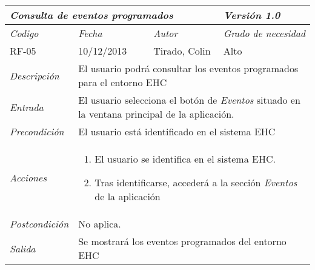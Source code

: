 \begin{tabular}{|p{3cm}|p{4cm}|p{4cm}|p{4cm}|}
\hline \multicolumn{3}{|p{9cm}|}{\textit{Consulta de eventos programados}} & \textit{Versi\'on 1.0} \\
\hline \textit{Codigo} & \textit{Fecha} & \textit{Autor} & \textit{Grado de necesidad} \\
RF-05 & 10/12/2013 & Tirado, Colin & Alto \\
\hline \textit{Descripci\'on} & \multicolumn{3}{|p{9cm}|}{El usuario podr\'a consultar los eventos programados para el entorno EHC} \\
\hline \textit{Entrada} & \multicolumn{3}{|p{9cm}|}{El usuario selecciona el bot\'on de \textit{Eventos} situado en la ventana principal de la aplicaci\'on.} \\
\hline \textit{Precondici\'on} & \multicolumn{3}{|p{9cm}|}{El usuario est\'a identificado en el sistema EHC} \\
\hline \textit{Acciones} & \multicolumn{3}{|p{9cm}|}{
\begin{enumerate}
\item El usuario se identifica en el sistema EHC.
\item Tras identificarse, acceder\'a a la secci\'on \textit{Eventos} de la aplicaci\'on
\end{enumerate}
} \\
\hline \textit{Postcondici\'on} & \multicolumn{3}{|p{9cm}|}{No aplica.} \\
\hline \textit{Salida} & \multicolumn{3}{|p{9cm}|}{Se mostrará los eventos programados del entorno EHC} \\ \hline
\end{tabular}